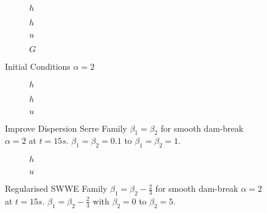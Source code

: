 \documentclass[10pt]{article}
\begin{document}
\begin{figure}
	\centering
	\begin{subfigure}{0.49\textwidth}
		\centering
		
		\caption{$h$}
	\end{subfigure}
	\begin{subfigure}{0.49\textwidth}
		\centering
		
		\caption{$h$}
	\end{subfigure}
	\begin{subfigure}{0.49\textwidth}
		\centering
		
		\caption{$u$}
	\end{subfigure}
	\begin{subfigure}{0.49\textwidth}
		\centering
		
		\caption{$G$}
	\end{subfigure}
	\caption{Initial Conditions $\alpha = 2$}
\end{figure}


\begin{figure}
	\centering
	\begin{subfigure}{0.49\textwidth}
		\centering
		
		\caption{$h$}
	\end{subfigure}
	\begin{subfigure}{0.49\textwidth}
		\centering
		
		\caption{$h$}
	\end{subfigure}
	\begin{subfigure}{0.49\textwidth}
		\centering
		
		\caption{$u$}
	\end{subfigure}
	\caption{Improve Dispersion Serre Family $\beta_1 = \beta_2$ for smooth dam-break $\alpha = 2$ at $t=15s$. $\beta_1 =\beta_2 = 0.1$ to $\beta_1 =\beta_2 = 1$. }
\end{figure}

\begin{figure}
	\centering
	\begin{subfigure}{0.49\textwidth}
		\centering
		
		\caption{$h$}
	\end{subfigure}
	\begin{subfigure}{0.49\textwidth}
		\centering
		
		\caption{$u$}
	\end{subfigure}
	\caption{Regularised SWWE Family $\beta_1 = \beta_2 - \frac{2}{3}$ for smooth dam-break $\alpha = 2$ at $t=15s$. $\beta_1 = \beta_2 - \frac{2}{3}$ with  $\beta_2 = 0$ to $\beta_2 = 5$. }
\end{figure}
\end{document}
